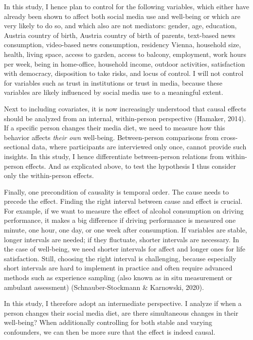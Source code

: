 \documentclass[
  english,
  man,mask,floatsintext]{apa6}
\begin{document}
In this study, I hence plan to control for the following variables, which either have already been shown to affect both social media use and well-being or which are very likely to do so, and which also are not mediators:
gender, age, education, Austria country of birth, Austria country of birth of parents, text-based news consumption, video-based news consumption, residency Vienna, household size, health, living space, access to garden, access to balcony, employment, work hours per week, being in home-office, household income, outdoor activities, satisfaction with democracy, disposition to take risks, and locus of control.
I will not control for variables such as trust in institutions or trust in media, because these variables are likely influenced by social media use to a meaningful extent.

Next to including covariates, it is now increasingly understood that causal effects should be analyzed from an internal, within-person perspective (Hamaker, 2014).
If a specific person changes their media diet, we need to measure how this behavior affects \emph{their own} well-being.
Between-person comparisons from cross-sectional data, where participants are interviewed only once, cannot provide such insights.
In this study, I hence differentiate between-person relations from within-person effects.
And as explicated above, to test the hypothesis I thus consider only the within-person effects.

Finally, one precondition of causality is temporal order.
The cause needs to precede the effect.
Finding the right interval between cause and effect is crucial.
For example, if we want to measure the effect of alcohol consumption on driving performance, it makes a big difference if driving performance is measured one minute, one hour, one day, or one week after consumption.
If variables are stable, longer intervals are needed; if they fluctuate, shorter intervals are necessary.
In the case of well-being, we need shorter intervals for affect and longer ones for life satisfaction.
Still, choosing the right interval is challenging, because especially short intervals are hard to implement in practice and often require advanced methods such as experience sampling (also known as in situ measurement or ambulant assessment) (Schnauber-Stockmann \& Karnowski, 2020).

In this study, I therefore adopt an intermediate perspective.
I analyze if when a person changes their social media diet, are there simultaneous changes in their well-being?
When additionally controlling for both stable and varying confounders, we can then be more sure that the effect is indeed causal.
\end{document}
